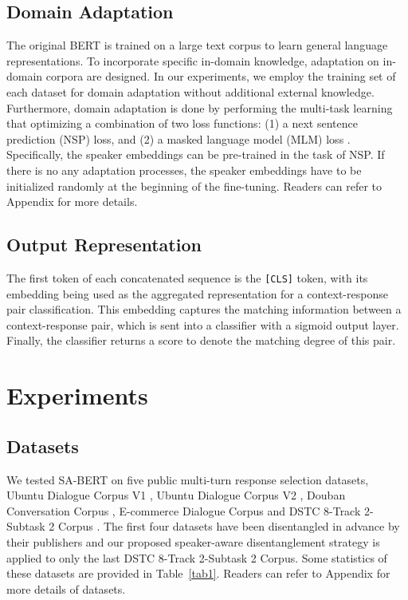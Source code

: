\documentclass[sigconf]{acmart}
\begin{document}
  \subsection{Domain Adaptation}
    The original BERT is trained on a large text corpus to learn general language representations.
    To incorporate specific in-domain knowledge, adaptation on in-domain corpora are designed.
    In our experiments, we employ the training set of each dataset for domain adaptation without additional external knowledge. 
    Furthermore, domain adaptation is done by performing the multi-task learning that optimizing a combination of two loss functions: (1) a next sentence prediction (NSP) loss, and (2) a masked language model (MLM) loss \cite{DBLP:conf/naacl/DevlinCLT19}. 
    Specifically, the speaker embeddings can be pre-trained in the task of NSP.
    If there is no any adaptation processes, the speaker embeddings have to be initialized randomly at the beginning of the fine-tuning.
    Readers can refer to Appendix for more details.
  
  \subsection{Output Representation}
    The first token of each concatenated sequence is the \texttt{[CLS]} token, with its embedding being used as the aggregated representation for a context-response pair classification.
    This embedding captures the matching information between a context-response pair, which is sent into a classifier with a sigmoid output layer. Finally, the classifier returns a score to denote the matching degree of this pair.
    

\section{Experiments}

  \subsection{Datasets}
    
    We tested SA-BERT on five public multi-turn response selection datasets, Ubuntu Dialogue Corpus V1 \cite{DBLP:conf/sigdial/LowePSP15}, Ubuntu Dialogue Corpus V2 \cite{DBLP:journals/dad/LowePSCLP17}, Douban Conversation Corpus \cite{DBLP:conf/acl/WuWXZL17}, E-commerce Dialogue Corpus \cite{DBLP:conf/coling/ZhangLZZL18} and DSTC 8-Track 2-Subtask 2 Corpus \cite{DBLP:journals/corr/abs-1911-06394}.
    The first four datasets have been disentangled in advance by their publishers and our proposed speaker-aware disentanglement strategy is applied to only the last DSTC 8-Track 2-Subtask 2 Corpus. 
Some statistics of these datasets are provided in Table~\ref{tab1}.
    Readers can refer to Appendix for more details of datasets.
\end{document}
